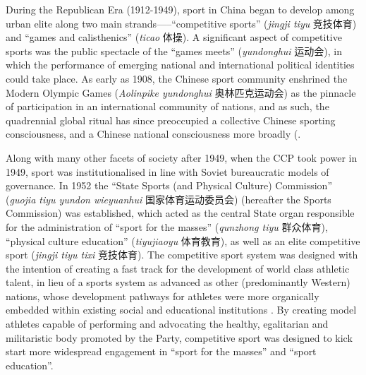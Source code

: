\begin{CJK}{UTF8}{gbsn}
During the Republican Era (1912-1949), sport in China began to develop among urban elite along two main strands—--``competitive sports'' (\textit{jingji tiyu} 竞技体育) and ``games and calisthenics'' (\textit{ticao} 体操).  A significant aspect of competitive sports was the public spectacle of the ``games meets'' (\textit{yundonghui} 运动会), in which the performance of emerging national and international political identities could take place.  As early as 1908, the Chinese sport community enshrined the Modern Olympic Games (\textit{Aolinpike yundonghui} 奥林匹克运动会) as the pinnacle of participation in an international community of nations, and as such, the quadrennial global ritual has since preoccupied a collective Chinese sporting consciousness, and a Chinese national consciousness more broadly (\citep{Jarvie2008;Barme2009;Brownell2008;Morris2004;Xu2008}.

Along with many other facets of society after 1949, when the CCP took power in 1949, sport was institutionalised in line with Soviet bureaucratic models of governance.  In 1952 the ``State Sports (and Physical Culture) Commission'' (\textit{guojia tiyu yundon wieyuanhui} 国家体育运动委员会) (hereafter the Sports Commission) was established, which acted as the central State organ responsible for the administration of ``sport for the masses'' (\textit{qunzhong tiyu} 群众体育), ``physical culture education'' (\textit{tiyujiaoyu} 体育教育), as well as an elite competitive sport (\textit{jingji tiyu tixi} 竞技体育).
The competitive sport system was designed with the intention of creating a fast track for the development of world class athletic talent, in lieu of a sports system as advanced as other (predominantly Western) nations, whose development pathways for athletes were more organically embedded within existing social and educational institutions \citep{Brownell2008}.  By creating model athletes capable of performing and advocating the healthy, egalitarian and militaristic body promoted by the Party, competitive sport was designed to kick start more widespread engagement in ``sport for the masses'' and ``sport education''\citep[56]{Brownell1995}.


\end{CJK}
